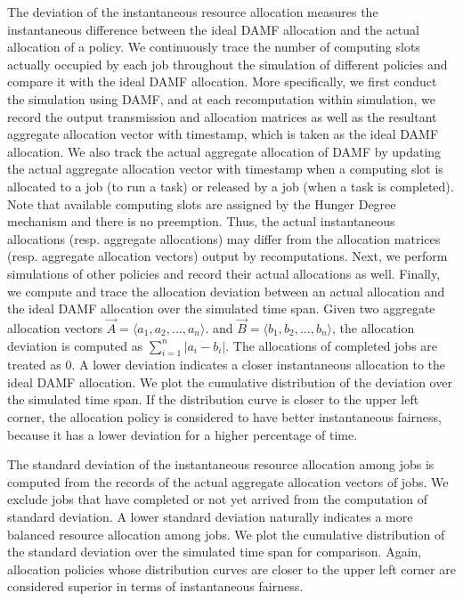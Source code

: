 The deviation of the instantaneous resource allocation measures the instantaneous difference between the ideal DAMF allocation and the actual allocation of a policy. We continuously trace the number of computing slots actually occupied by each job throughout the simulation of different policies and compare it with the ideal DAMF allocation. More specifically, we first conduct the simulation using DAMF, and at each recomputation within simulation, we record the output transmission and allocation matrices as well as the resultant aggregate allocation vector with timestamp, which is taken as the ideal DAMF allocation. We also track the actual aggregate allocation of DAMF by updating the actual aggregate allocation vector with timestamp when a computing slot is allocated to a job (to run a task) or released by a job (when a task is completed). Note that available computing slots are assigned by the Hunger Degree mechanism and there is no preemption. Thus, the actual instantaneous allocations (resp. aggregate allocations) may differ from the allocation matrices (resp. aggregate allocation vectors) output by recomputations. Next, we perform simulations of other policies and record their actual allocations as well. Finally, we compute and trace the allocation deviation between an actual allocation and the ideal DAMF allocation over the simulated time span. Given two aggregate allocation vectors $\vec{A} = \langle a_1, a_2, ..., a_n \rangle.$ and $\vec{B} = \langle b_1, b_2, ..., b_n \rangle$, the allocation deviation is computed as $\sum_{i=1}^n |a_i - b_i|$. The allocations of completed jobs are treated as 0. A lower deviation indicates a closer instantaneous allocation to the ideal DAMF allocation. We plot the cumulative distribution of the deviation over the simulated time span. If the distribution curve is closer to the upper left corner, the allocation policy is considered to have better instantaneous fairness, because it has a lower deviation for a higher percentage of time. 

The standard deviation of the instantaneous resource allocation among jobs is computed from the records of the actual aggregate allocation vectors of jobs. We exclude jobs that have completed or not yet arrived from the computation of standard deviation. A lower standard deviation naturally indicates a more balanced resource allocation among jobs. We plot the cumulative distribution of the standard deviation over the simulated time span for comparison. Again, allocation policies whose distribution curves are closer to the upper left corner are considered superior in terms of instantaneous fairness. 

